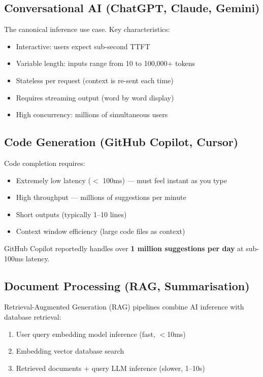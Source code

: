 \documentclass[12pt, twoside, openright]{book}
\begin{document}
\subsection{Conversational AI (ChatGPT, Claude, Gemini)}

The canonical inference use case.
Key characteristics:
\begin{itemize}
  \item Interactive: users expect sub-second TTFT
  \item Variable length: inputs range from 10 to 100,000+ tokens
  \item Stateless per request (context is re-sent each time)
  \item Requires streaming output (word by word display)
  \item High concurrency: millions of simultaneous users
\end{itemize}

\subsection{Code Generation (GitHub Copilot, Cursor)}

Code completion requires:
\begin{itemize}
  \item Extremely low latency ($<$ 100ms) --- must feel instant as you type
  \item High throughput --- millions of suggestions per minute
  \item Short outputs (typically 1--10 lines)
  \item Context window efficiency (large code files as context)
\end{itemize}

GitHub Copilot reportedly handles over \textbf{1 million suggestions
per day} at sub-100ms latency.

\subsection{Document Processing (RAG, Summarisation)}

Retrieval-Augmented Generation (RAG) pipelines combine AI inference
with database retrieval:
\begin{enumerate}
  \item User query \textrightarrow{} embedding model inference (fast, $<$10ms)
  \item Embedding \textrightarrow{} vector database search
  \item Retrieved documents + query \textrightarrow{} LLM inference (slower, 1--10s)
\end{enumerate}
\end{document}
